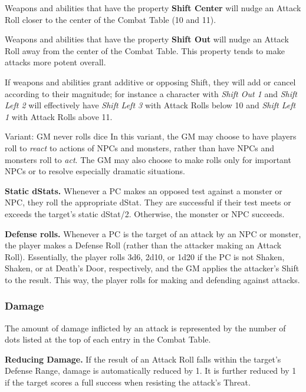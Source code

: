 \documentclass[10pt,twoside,twocolumn,openany]{book}
\begin{document}
Weapons and abilities that have the property \textbf{Shift Center} will nudge an Attack Roll closer to the center of the Combat Table (10 and 11).

Weapons and abilities that have the property \textbf{Shift Out} will nudge an Attack Roll away from the center of the Combat Table. This property tends to make attacks more potent overall.

If weapons and abilities grant additive or opposing Shift, they will add or cancel according to their magnitude; for instance a character with \textit{Shift Out 1} and \textit{Shift Left 2} will effectively have \textit{Shift Left 3} with Attack Rolls below 10 and \textit{Shift Left 1} with Attack Rolls above 11.

\begin{commentbox}{Variant: GM never rolls dice}
In this variant, the GM may choose to have players roll to \textit{react} to actions of NPCs and monsters, rather than have NPCs and monsters roll to \textit{act}. The GM may also choose to make rolls only for important NPCs or to resolve especially dramatic situations.
\par \textbf{Static dStats.} Whenever a PC makes an opposed test against a monster or NPC, they roll the appropriate dStat. They are successful if their test meets or exceeds the target's static dStat/2. Otherwise, the monster or NPC succeeds.
\par \textbf{Defense rolls.} Whenever a PC is the target of an attack by an NPC or monster, the player makes a Defense Roll (rather than the attacker making an Attack Roll). Essentially, the player rolls 3d6, 2d10, or 1d20 if the PC is not Shaken, Shaken, or at Death's Door, respectively, and the GM applies the attacker's Shift to the result. This way, the player rolls for making and defending against attacks.
\end{commentbox}

\subsubsection{Damage}
The amount of damage inflicted by an attack is represented by the number of dots listed at the top of each entry in the Combat Table.

\textbf{Reducing Damage.} If the result of an Attack Roll falls within the target's Defense Range, damage is automatically reduced by 1. It is further reduced by 1 if the target scores a full success when resisting the attack's Threat.
\end{document}
